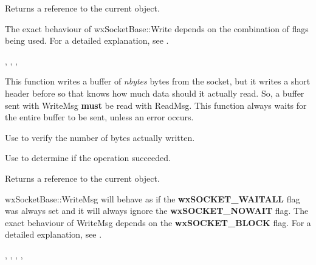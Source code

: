 
Returns a reference to the current object.


The exact behaviour of wxSocketBase::Write depends on the combination
of flags being used. For a detailed explanation, see .


, 
, 
, 

%
%
\label{wxsocketbasewritemsg}


This function writes a buffer of {\it nbytes} bytes from the socket, but it
writes a short header before so that  
knows how much data should it actually read. So, a buffer sent with WriteMsg 
{\bf must} be read with ReadMsg. This function always waits for the entire
buffer to be sent, unless an error occurs.

Use  to verify the number of bytes actually written.

Use  to determine if the operation succeeded.





Returns a reference to the current object.


wxSocketBase::WriteMsg will behave as if the {\bf wxSOCKET\_WAITALL} flag
was always set and it will always ignore the {\bf wxSOCKET\_NOWAIT} flag.
The exact behaviour of WriteMsg depends on the {\bf wxSOCKET\_BLOCK} flag.
For a detailed explanation, see .


, 
, 
, 
, 


